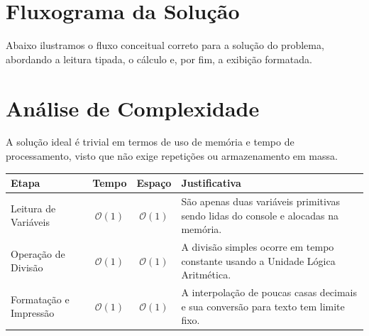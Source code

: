 \documentclass{article}
\begin{document}
\section{Fluxograma da Solução}

Abaixo ilustramos o fluxo conceitual correto para a solução do problema, abordando a leitura tipada, o cálculo e, por fim, a exibição formatada.

\begin{center}
\end{center}

\section{Análise de Complexidade}

A solução ideal é trivial em termos de uso de memória e tempo de processamento, visto que não exige repetições ou armazenamento em massa.

\vspace{1em}
\begin{tabularx}{\textwidth}{@{} l c c X @{}}
\toprule
\textbf{Etapa} & \textbf{Tempo} & \textbf{Espaço} & \textbf{Justificativa} \\
\midrule
Leitura de Variáveis & $\mathcal{O}(1)$ & $\mathcal{O}(1)$ & São apenas duas variáveis primitivas sendo lidas do console e alocadas na memória. \\
Operação de Divisão & $\mathcal{O}(1)$ & $\mathcal{O}(1)$ & A divisão simples ocorre em tempo constante usando a Unidade Lógica Aritmética. \\
Formatação e Impressão & $\mathcal{O}(1)$ & $\mathcal{O}(1)$ & A interpolação de poucas casas decimais e sua conversão para texto tem limite fixo. \\
\bottomrule
\end{tabularx}
\vspace{1em}
\end{document}
